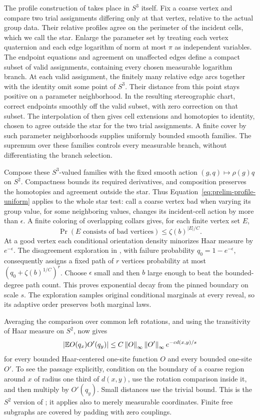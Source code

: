 The profile construction of  takes place in $S^3$
itself. Fix a coarse vertex and compare two trial assignments differing
only at that vertex, relative to the actual group data. Their relative
profiles agree on the perimeter of the incident cells, which we call
the star. Enlarge the parameter set by treating each vertex quaternion
and each edge logarithm of norm at most $\pi$ as independent variables.
The endpoint equations and agreement on unaffected edges define a
compact subset of valid assignments, containing every chosen measurable
logarithm branch. At each valid assignment, the finitely many relative
edge arcs together with the identity omit some point of $S^3$.
Their distance from this point stays positive on a parameter
neighborhood. In the resulting stereographic chart, correct endpoints
smoothly off the valid subset, with zero correction on that subset.
The interpolation of  then gives cell extensions
and homotopies to identity, chosen to agree outside the star for the
two trial assignments. A finite cover by such parameter neighborhoods
supplies uniformly bounded smooth families. The supremum over these
families controls every measurable branch, without differentiating
the branch selection.

Compose these $S^3$-valued families with the fixed smooth action
$(g,q)\mapsto\rho(g)q$ on $S^2$. Compactness bounds its required
derivatives, and composition preserves the homotopies and agreement
outside the star. Thus Equation~\eqref{eq:prelim-profile-uniform} applies
to the whole star test: call a coarse vertex bad when varying its group value,
for some neighboring values, changes its incident-cell action by more
than $\epsilon$. A finite coloring of overlapping collars gives, for
each finite vertex set $E$,
\[
 \Pr(E\text{ consists of bad vertices})\le\zeta(b)^{|E|/C}.
\]
At a good vertex each conditional orientation density minorizes Haar
measure by $e^{-\epsilon}$. The disagreement exploration in
, with failure probability
$q_0=1-e^{-\epsilon}$, consequently assigns a fixed path of $r$ vertices
probability at most $(q_0+\zeta(b)^{1/C})^r$. Choose $\epsilon$ small
and then $b$ large enough to beat the bounded-degree path count.
This proves exponential decay from the pinned boundary on scale $s$.
The exploration samples original conditional marginals at every reveal,
so its adaptive order preserves both marginal laws.

Averaging the comparison over common left rotations, and using the
transitivity of Haar measure on $S^2$, now gives
\begin{equation}
 |\mathbb E O(q_x)O'(q_y)|\le
 C\left\lVert O\right\rVert_\infty\left\lVert O'\right\rVert_\infty e^{-cd(x,y)/s}
 \label{eq:prelim-one-site}
\end{equation}
for every bounded Haar-centered one-site function $O$ and every bounded
one-site $O'$. To see the passage explicitly, condition on the boundary
of a coarse region around $x$ of radius one third of $d(x,y)$, use the
rotation comparison inside it, and then multiply by $O'(q_y)$.
Small distances use the trivial bound. This is the $S^2$ version of
; it applies also to merely measurable coordinates.
Finite free subgraphs are covered by padding with zero couplings.

